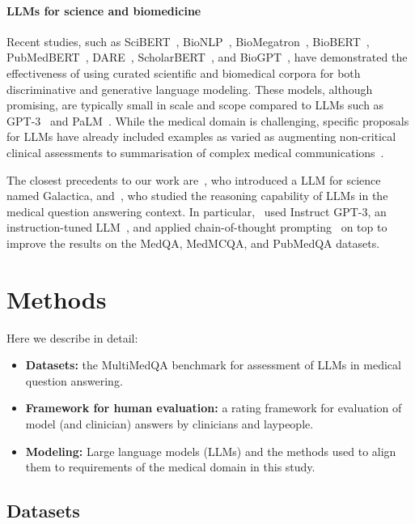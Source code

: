 \paragraph{LLMs for science and biomedicine}  Recent studies, such as SciBERT~\cite{beltagy2019scibert}, BioNLP~\cite{lewis2020pretrained}, BioMegatron~\cite{shin2020biomegatron}, BioBERT~\cite{lee2020biobert}, PubMedBERT~\cite{gu2021domain}, DARE~\cite{papanikolaou2020dare}, ScholarBERT~\cite{hong2022scholarbert}, and BioGPT~\cite{luo2022biogpt}, have demonstrated the effectiveness of using curated scientific and biomedical corpora for both discriminative and generative language modeling. These models, although promising, are typically small in scale and scope compared to LLMs such as GPT-3~\cite{brown2020language} and PaLM~\cite{chowdhery2022palm}. While the medical domain is challenging, specific proposals for LLMs have already included examples as varied as augmenting non-critical clinical assessments to summarisation of complex medical communications~\cite{korngiebel2021considering, sezgin2022operationalizing, agrawal2022large}.

The closest precedents to our work are~\citet{taylor2022galactica}, who introduced a LLM for science named Galactica, and~\citet{lievin2022can}, who studied the reasoning capability of LLMs in the medical question answering context. In particular,~\citet{lievin2022can} used Instruct GPT-3, an instruction-tuned LLM~\cite{ouyang2022training}, and applied chain-of-thought prompting~\cite{wei2022chain} on top to improve the results on the MedQA, MedMCQA, and PubMedQA datasets.

\section{Methods}
Here we describe in detail:

\begin{itemize}
    \item \textbf{Datasets:} the MultiMedQA benchmark for assessment of LLMs in medical question answering.
    \item \textbf{Framework for human evaluation:} a rating framework for evaluation of model (and clinician) answers by clinicians and laypeople.
    \item \textbf{Modeling:} Large language models (LLMs) and the methods used to align them to requirements of the medical domain in this study.
\end{itemize}

\subsection{Datasets}
\label{sec:datasets}

